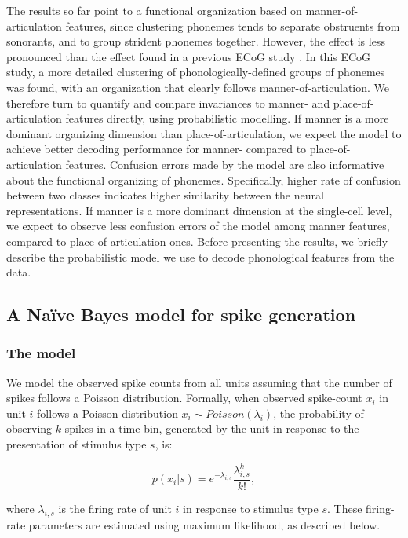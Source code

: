 The results so far point to a functional organization based on manner-of-articulation features, since clustering phonemes tends to separate obstruents from sonorants, and to group strident phonemes together. However, the effect is less pronounced than the effect found in a previous ECoG study \citep{Mesgarani2014}. In this ECoG study, a more detailed clustering of phonologically-defined groups of phonemes was found, with an organization that clearly follows manner-of-articulation. We therefore turn to quantify and compare invariances to manner- and place-of-articulation features directly, using probabilistic modelling. If manner is a more dominant organizing dimension than place-of-articulation, we expect the model to achieve better decoding performance for manner- compared to place-of-articulation features. Confusion errors made by the model are also informative about the functional organizing of phonemes. Specifically, higher rate of confusion between two classes indicates higher similarity between the neural representations. If manner is a more dominant dimension at the single-cell level, we expect to observe less confusion errors of the model among manner features, compared to place-of-articulation ones. Before presenting the results, we briefly describe the probabilistic model we use to decode phonological features from the data.

\subsection{A Na\"{i}ve Bayes model for spike generation}
\subsubsection{The model}
We model the observed spike counts from all units assuming that the number of spikes follows a Poisson distribution. Formally, when observed spike-count $x_i$ in unit $i$ follows a Poisson distribution $x_i \sim Poisson(\lambda_i)$, the probability of observing $k$ spikes in a time bin, generated by the unit in response to the presentation of stimulus type $s$, is:

\begin{equation}
    p(x_i|s)=e^{-\lambda_{i,s}}\frac{\lambda_{i,s}^k}{k!},
\end{equation}

where $\lambda_{i,s}$ is the firing rate of unit $i$ in response to stimulus type $s$. These firing-rate parameters are estimated using maximum likelihood, as described below.

